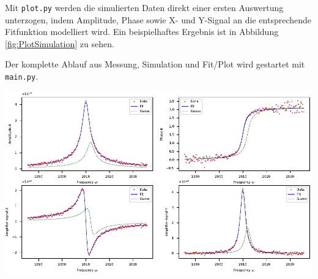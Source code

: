 Mit \texttt{plot.py} werden die simulierten Daten direkt einer ersten Auswertung unterzogen, indem Amplitude, Phase sowie X- und Y-Signal an die entsprechende Fitfunktion modelliert wird.
Ein beispielhaftes Ergebnis ist in Abbildung \ref{fig:PlotSimulation} zu sehen.

Der komplette Ablauf aus Messung, Simulation und Fit/Plot wird gestartet mit \texttt{main.py}.

\minipage{\linewidth}
    \begin{center}
        \captionsetup{type=figure}
        \begin{adjustbox}{max width=\linewidth, keepaspectratio}
            \includegraphics[]{pdf/Simulation}
        \end{adjustbox}
        \label{fig:PlotSimulation}
    \end{center}
\endminipage
